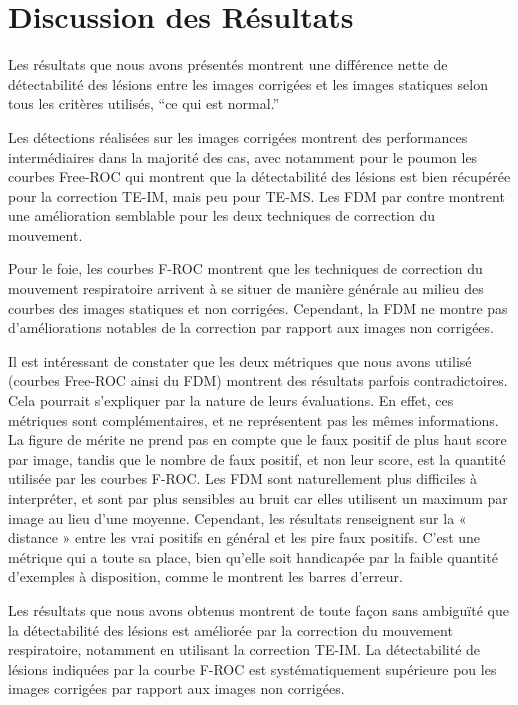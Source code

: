 \section{Discussion des Résultats}

Les résultats que nous avons présentés montrent une différence nette de détectabilité des lésions entre les images corrigées et les images statiques selon tous les critères utilisés, ``ce qui est normal.''

Les détections réalisées sur les images corrigées montrent des performances intermédiaires dans la majorité des cas, avec notamment pour le poumon les courbes Free-ROC qui montrent que la détectabilité des lésions est bien récupérée pour la correction TE-IM, mais peu pour TE-MS. Les FDM par contre montrent une amélioration semblable pour les deux techniques de correction du mouvement. 

Pour le foie, les courbes F-ROC montrent que les techniques de correction du mouvement respiratoire arrivent à se situer de manière générale au milieu des courbes des images statiques et non corrigées. Cependant, la FDM ne montre pas d'améliorations notables de la correction par rapport aux images non corrigées.

Il est intéressant de constater que les deux métriques que nous avons utilisé (courbes Free-ROC ainsi du FDM) montrent des résultats parfois contradictoires. Cela pourrait s'expliquer par la nature de leurs évaluations. En effet, ces métriques sont complémentaires, et ne représentent pas les mêmes informations. La figure de mérite ne prend pas en compte que le faux positif de plus haut score par image, tandis que le nombre de faux positif, et non leur score, est la quantité utilisée par les courbes F-ROC. Les FDM sont naturellement plus difficiles à interpréter, et sont par plus sensibles au bruit car  elles utilisent un maximum par image au lieu d’une moyenne. Cependant, les résultats renseignent sur la « distance » entre les vrai  positifs en général et les pire faux positifs. C’est une métrique qui a toute sa place, bien qu’elle soit handicapée par la faible  quantité d’exemples à disposition, comme le montrent les barres d’erreur.

Les résultats que nous avons obtenus montrent de toute façon sans ambiguïté que la détectabilité des lésions est améliorée par la correction du mouvement respiratoire, notamment en utilisant la correction TE-IM. La détectabilité de lésions indiquées par la courbe F-ROC est systématiquement supérieure pou les images corrigées par rapport aux images non corrigées.

